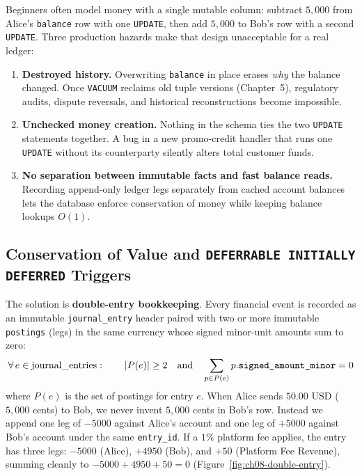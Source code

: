 Beginners often model money with a single mutable column: subtract $5{,}000$ from
Alice's \texttt{balance} row with one \texttt{UPDATE}, then add $5{,}000$ to Bob's
row with a second \texttt{UPDATE}. Three production hazards make that design
unacceptable for a real ledger:
\begin{enumerate}
  \item \textbf{Destroyed history.} Overwriting \texttt{balance} in place erases
    \emph{why} the balance changed. Once \texttt{VACUUM} reclaims old tuple
    versions (Chapter~5), regulatory audits, dispute reversals, and historical
    reconstructions become impossible.
  \item \textbf{Unchecked money creation.} Nothing in the schema ties the two
    \texttt{UPDATE} statements together. A bug in a new promo-credit handler that
    runs one \texttt{UPDATE} without its counterparty silently alters total
    customer funds.
  \item \textbf{No separation between immutable facts and fast balance reads.}
    Recording append-only ledger legs separately from cached account balances lets
    the database enforce conservation of money while keeping balance lookups $O(1)$.
\end{enumerate}

\subsection{Conservation of Value and \texttt{DEFERRABLE INITIALLY DEFERRED} Triggers}
\label{ch08:deferred-triggers}

The solution is \textbf{double-entry bookkeeping}. Every financial event is recorded as an immutable
\texttt{journal\_entry} header paired with two or more immutable \texttt{postings}
(legs) in the same currency whose signed minor-unit amounts sum to zero:
\[
  \forall\, e \in \text{journal\_entries}:\qquad
  \lvert P(e)\rvert \ge 2
  \quad\text{and}\quad
  \sum_{p \in P(e)} p.\texttt{signed\_amount\_minor} = 0
\]
where $P(e)$ is the set of postings for entry $e$. When Alice sends $50.00\text{ USD}$ ($5{,}000$ cents) to Bob, we never invent
$5{,}000$ cents in Bob's row. Instead we append one leg of $-5000$ against Alice's
account and one leg of $+5000$ against Bob's account under the same
\texttt{entry\_id}. If a $1\%$ platform fee applies, the entry has three legs:
$-5000$ (Alice), $+4950$ (Bob), and $+50$ (Platform Fee Revenue), summing cleanly
to $-5000 + 4950 + 50 = 0$ (Figure~\ref{fig:ch08-double-entry}).

